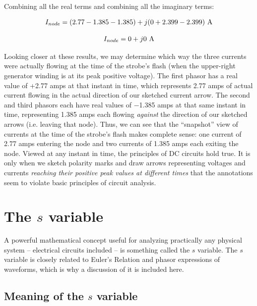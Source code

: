 Combining all the real terms and combining all the imaginary terms:

$$I_{node} = (2.77 - 1.385 - 1.385) + j(0 + 2.399 - 2.399) \hbox{ A}$$

$$I_{node} = 0 + j 0 \hbox{ A}$$

Looking closer at these results, we may determine which way the three currents were actually flowing at the time of the strobe's flash (when the upper-right generator winding is at its peak positive voltage).  The first phasor has a real value of +2.77 amps at that instant in time, which represents 2.77 amps of actual current flowing in the actual direction of our sketched current arrow.  The second and third phasors each have real values of $-$1.385 amps at that same instant in time, representing 1.385 amps each flowing \textit{against} the direction of our sketched arrows (i.e. leaving that node).  Thus, we can see that the ``snapshot'' view of currents at the time of the strobe's flash makes complete sense: one current of 2.77 amps entering the node and two currents of 1.385 amps each exiting the node.  Viewed at any instant in time, the principles of DC circuits hold true.  It is only when we sketch polarity marks and draw arrows representing voltages and currents \textit{reaching their positive peak values at different times} that the annotations seem to violate basic principles of circuit analysis.











\filbreak
\section{The $s$ variable}

\label{s_variable}

A powerful mathematical concept useful for analyzing practically any physical system -- electrical circuits included -- is something called the $s$ variable.  The $s$ variable is closely related to Euler's Relation and phasor expressions of waveforms, which is why a discussion of it is included here.







\filbreak
\subsection{Meaning of the $s$ variable}

